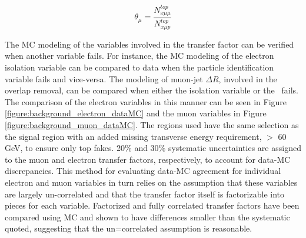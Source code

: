 \begin{equation}
\theta_{\mu} = \frac{N^{top}_{x\mu\mu}}{N^{top}_{x\mu p}}
\label{equation:background_theta_3l_m}
\end{equation}




The MC modeling of the variables involved in the transfer factor can be verified when another variable fails. For instance, the MC modeling of the electron isolation variable can be compared to data when the particle identification variable fails and vice-versa. The modeling of muon-jet $\Delta R$, involved in the overlap removal, can be compared when either the isolation variable or the \pt\ fails. The comparison of the electron variables in this manner can be seen in Figure \ref{figure:background_electron_dataMC} and the muon variables in Figure \ref{figure:background_muon_dataMC}. The regions used have the same selection as the signal region with an added missing transverse energy requirement, $>$ 60 GeV, to ensure only top fakes. 20\% and 30\% systematic uncertainties are assigned to the muon and electron transfer factors, respectively, to account for data-MC discrepancies. This method for evaluating data-MC agreement for individual electron and muon variables in turn relies on the assumption that these variables are largely un-correlated and that the transfer factor itself is factorizable into pieces for each variable. Factorized and fully correlated transfer factors have been compared using MC and shown to have differences smaller than the systematic quoted, suggesting that the un=correlated assumption is reasonable. 


